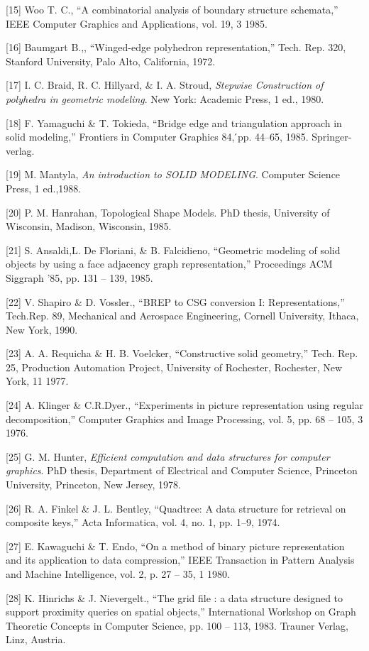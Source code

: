 \documentclass[11pt, oneside]{Thesis} %
\begin{document}
[15] Woo T. C., “A combinatorial analysis of boundary structure schemata,” IEEE Computer 
Graphics and Applications, vol. 19, 3 1985.

[16] Baumgart B.,, “Winged-edge polyhedron representation,” Tech. Rep. 320, Stanford 
University, Palo Alto, California, 1972.

[17] I. C. Braid, R. C. Hillyard, & I. A. Stroud, \textit{Stepwise Construction of polyhedra in
geometric modeling}. New York: Academic Press, 1 ed., 1980.

[18] F. Yamaguchi & T. Tokieda, “Bridge edge and triangulation approach in solid modeling,” 
Frontiers in Computer Graphics 84, ́pp. 44–65, 1985. Springer-verlag.

[19] M. Mantyla, \textit{An introduction to SOLID MODELING}. Computer Science Press, 1 ed.,1988.

[20] P. M. Hanrahan, Topological Shape Models. PhD thesis, University of Wisconsin,
Madison, Wisconsin, 1985.

[21] S. Ansaldi,L. De Floriani, & B. Falcidieno, “Geometric modeling of solid objects by
using a face adjacency graph representation,” Proceedings ACM Siggraph ’85, pp. 131 – 139, 1985.

[22] V. Shapiro & D. Vossler., “BREP to CSG conversion I: Representations,” Tech.Rep. 89,
 Mechanical and Aerospace Engineering, Cornell University, Ithaca, New York, 1990.

[23] A. A. Requicha & H. B. Voelcker, “Constructive solid geometry,” Tech. Rep. 25,
Production Automation Project, University of Rochester, Rochester, New York, 11 1977.

[24] A. Klinger & C.R.Dyer., “Experiments in picture representation using regular decomposition,”
 Computer Graphics and Image Processing, vol. 5, pp. 68 – 105, 3 1976.

[25] G. M. Hunter, \textit{Efficient computation and data structures for computer graphics}. PhD thesis, 
Department of Electrical and Computer Science, Princeton University, Princeton, New Jersey, 1978.

[26] R. A. Finkel & J. L. Bentley, “Quadtree: A data structure for retrieval on composite keys,”
 Acta Informatica, vol. 4, no. 1, pp. 1–9, 1974.

[27] E. Kawaguchi & T. Endo, “On a method of binary picture representation and its application to
 data compression,” IEEE Transaction in Pattern Analysis and Machine Intelligence, vol. 2, p. 27 – 35, 1 1980.

[28] K. Hinrichs & J. Nievergelt., “The grid file : a data structure designed to support
proximity queries on spatial objects,” International Workshop on Graph Theoretic Concepts
 in Computer Science, pp. 100 – 113, 1983. Trauner Verlag, Linz, Austria.
\end{document}
